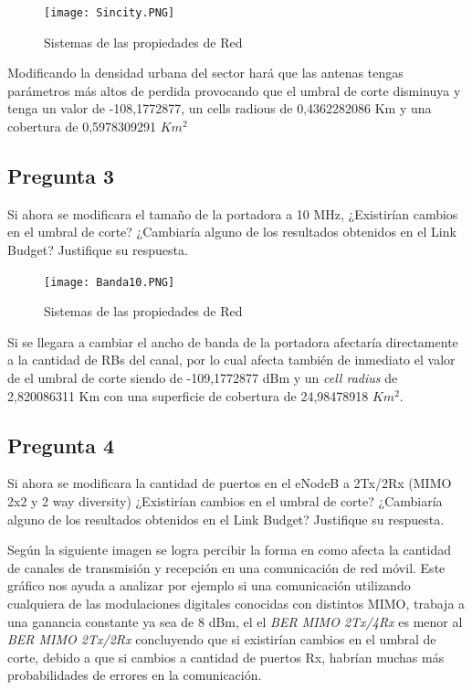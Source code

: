 \documentclass[Article, letterpaper,12pt]{article}
\begin{document}
\begin{figure}[H]
    \centering
    \texttt{[image: Sincity.PNG]}
    \caption{Sistemas de las propiedades de Red}
    \label{fig:my_label}
\end{figure}
Modificando la densidad urbana del sector hará que las antenas tengas parámetros más altos de perdida provocando que el umbral de corte disminuya y tenga un valor de -108,1772877, un cells radious de 0,4362282086 Km y una cobertura de  0,5978309291 $Km^{2}$

\subsection{Pregunta 3}

Si ahora se modificara el tamaño de la portadora a 10 MHz, ¿Existirían cambios en el umbral de corte? ¿Cambiaría alguno
de los resultados obtenidos en el Link Budget? Justifique su respuesta.

\begin{figure}[H]
    \centering
    \texttt{[image: Banda10.PNG]}
    \caption{Sistemas de las propiedades de Red}
    \label{fig:my_label}
\end{figure}

Si se llegara a cambiar el ancho de banda de la portadora afectaría directamente a la cantidad de RBs del canal, por lo cual afecta también de inmediato el valor de el umbral de corte siendo de -109,1772877 dBm y un \textit{cell radius} de 2,820086311 Km  con una superficie de cobertura de 24,98478918 $Km^{2}$.

\subsection{Pregunta 4}
Si ahora se modificara la cantidad de puertos en el eNodeB a 2Tx/2Rx (MIMO 2x2 y 2 way diversity) ¿Existirían cambios en el
umbral de corte? ¿Cambiaría alguno de los resultados obtenidos en el Link Budget? Justifique su respuesta.

Según la siguiente imagen se logra percibir la forma en como afecta la cantidad de canales de transmisión y recepción en una comunicación de red móvil. Este gráfico nos ayuda a analizar por ejemplo si una comunicación utilizando cualquiera de las modulaciones digitales conocidas con distintos MIMO, trabaja a una ganancia constante ya sea de 8 dBm, el el \textit{BER MIMO 2Tx/4Rx} es menor al \textit{BER MIMO 2Tx/2Rx} concluyendo que si existirían cambios en el umbral de corte, debido a que si cambios a cantidad de puertos Rx, habrían muchas más probabilidades de errores en la comunicación.
\end{document}
